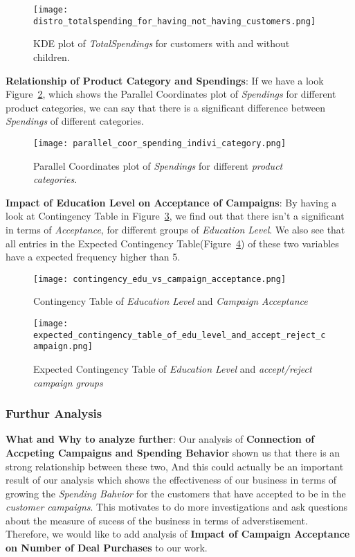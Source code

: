 \documentclass[a4paper,12pt]{article}
\begin{document}
\begin{figure}[H]
    \centering
    \texttt{[image: distro\_totalspending\_for\_having\_not\_having\_customers.png]}
    \caption{KDE plot of \textit{TotalSpendings} for customers with and without children.}
    \label{fig:Figure_4}
\end{figure}


\noindent \textbf{Relationship of Product Category and Spendings}: If we have a look Figure~\ref{fig:Figure_5}, which shows the Parallel Coordinates plot of \textit{Spendings} for different product categories, 
we can say that there is a significant difference between \textit{Spendings} of different categories.

\begin{figure}[H]
    \centering
    \texttt{[image: parallel\_coor\_spending\_indivi\_category.png]}
    \caption{Parallel Coordinates plot of \textit{Spendings} for different \textit{product categories}.}
    \label{fig:Figure_5}
\end{figure}


\noindent \textbf{Impact of Education Level on Acceptance of Campaigns}: By having a look at Contingency Table in Figure~\ref{fig:Figure_6}, we find out that there isn't a significant in terms of \textit{Acceptance}, 
for different groups of \textit{Education Level}. We also see that all entries in the Expected Contingency Table(Figure~\ref{fig:Figure_7}) of these two variables have a expected frequency higher than 5.

\begin{figure}[H]
    \centering
    \texttt{[image: contingency\_edu\_vs\_campaign\_acceptance.png]}
    \caption{Contingency Table of \textit{Education Level} and \textit{Campaign Acceptance}}
    \label{fig:Figure_6}
\end{figure}

\begin{figure}[H]
    \centering
    \texttt{[image: expected\_contingency\_table\_of\_edu\_level\_and\_accept\_reject\_campaign.png]}
    \caption{Expected Contingency Table of \textit{Education Level} and \textit{accept/reject campaign groups}}
    \label{fig:Figure_7}
\end{figure}


\subsubsection*{Furthur Analysis} 
\noindent \textbf{What and Why to analyze further}: Our analysis of \textbf{Connection of Accpeting Campaigns and Spending Behavior} shown us that there is an strong relationship between these two, 
And this could actually be an important result of our analysis which shows the effectiveness of our business in terms of growing the \textit{Spending Bahvior} for the customers that have accepted to be in the \textit{customer campaigns}. 
This motivates to do more investigations and ask questions about the measure of sucess of the business in terms of adverstisement. Therefore, we would like to add analysis of \textbf{Impact of Campaign Acceptance on Number of Deal Purchases} to our work. \\
\end{document}
